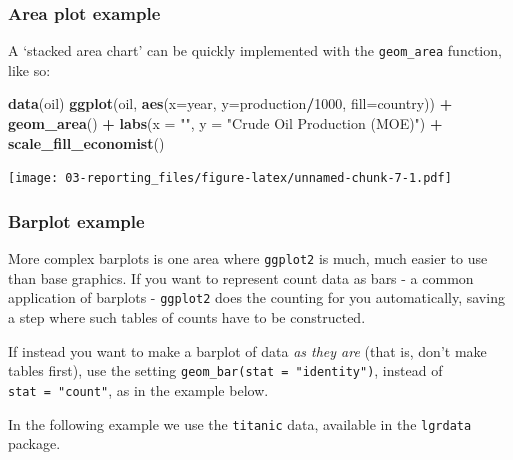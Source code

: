 \documentclass[]{book}
\newenvironment{Shaded}{\begin{snugshade}}{\end{snugshade}}
\newcommand{\CommentTok}[1]{\textcolor[rgb]{0.56,0.35,0.01}{\textit{#1}}}
\newcommand{\DataTypeTok}[1]{\textcolor[rgb]{0.13,0.29,0.53}{#1}}
\newcommand{\DecValTok}[1]{\textcolor[rgb]{0.00,0.00,0.81}{#1}}
\newcommand{\KeywordTok}[1]{\textcolor[rgb]{0.13,0.29,0.53}{\textbf{#1}}}
\newcommand{\NormalTok}[1]{#1}
\newcommand{\OperatorTok}[1]{\textcolor[rgb]{0.81,0.36,0.00}{\textbf{#1}}}
\newcommand{\StringTok}[1]{\textcolor[rgb]{0.31,0.60,0.02}{#1}}
\begin{document}
\hypertarget{area-plot-example}{%
\subsubsection{Area plot example}\label{area-plot-example}}

A `stacked area chart' can be quickly implemented with the \texttt{geom\_area} function, like so:

\begin{Shaded}
\begin{Highlighting}[]
\KeywordTok{data}\NormalTok{(oil)}
\KeywordTok{ggplot}\NormalTok{(oil, }\KeywordTok{aes}\NormalTok{(}\DataTypeTok{x=}\NormalTok{year, }\DataTypeTok{y=}\NormalTok{production}\OperatorTok{/}\DecValTok{1000}\NormalTok{, }\DataTypeTok{fill=}\NormalTok{country)) }\OperatorTok{+}\StringTok{ }
\StringTok{  }\KeywordTok{geom_area}\NormalTok{() }\OperatorTok{+}\StringTok{ }
\StringTok{  }\KeywordTok{labs}\NormalTok{(}\DataTypeTok{x =} \StringTok{""}\NormalTok{, }\DataTypeTok{y =} \StringTok{"Crude Oil Production (MOE)"}\NormalTok{) }\OperatorTok{+}
\StringTok{  }\KeywordTok{scale_fill_economist}\NormalTok{()}
\end{Highlighting}
\end{Shaded}

\texttt{[image: 03-reporting\_files/figure-latex/unnamed-chunk-7-1.pdf]}

\hypertarget{barplot-example}{%
\subsubsection{Barplot example}\label{barplot-example}}

More complex barplots is one area where \texttt{ggplot2} is much, much easier to use than base graphics. If you want to represent count data as bars - a common application of barplots - \texttt{ggplot2} does the counting for you automatically, saving a step where such tables of counts have to be constructed.

If instead you want to make a barplot of data \emph{as they are} (that is, don't make tables first), use the setting \texttt{geom\_bar(stat\ =\ "identity")}, instead of \texttt{stat\ =\ "count"}, as in the example below.

In the following example we use the \texttt{titanic} data, available in the \texttt{lgrdata} package.

\begin{Shaded}
\end{Shaded}
\end{document}
